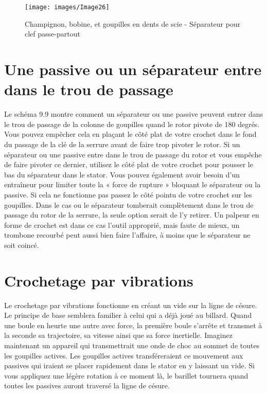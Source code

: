 \documentclass[a4paper,french,11pt,twoside]{report}
\begin{document}

\begin{figure}[ht] \begin{center}
        \texttt{[image: images/Image26]}
        \caption{Champignon, bobine, et goupilles en dents de scie - Séparateur pour clef passe-partout}
\end{center} \end{figure}


\section{\label{passive_separateur_trou_passage}Une passive ou un séparateur entre dans le trou de passage}

Le schéma 9.9 montre comment un séparateur ou une passive peuvent entrer dans le trou de passage de la colonne de goupilles quand le rotor pivote de 180 degrés. Vous pouvez empêcher cela en plaçant le côté plat de votre crochet dans le fond du passage de la clé de la serrure avant de faire trop pivoter le rotor. Si un séparateur ou une passive entre dans le trou de passage du rotor et vous empêche de faire pivoter ce dernier, utilisez le côté plat de votre crochet pour pousser le bas du séparateur dans le stator. Vous pouvez également avoir besoin d'un entraîneur pour limiter toute la « force de rupture » bloquant le séparateur ou la passive. Si cela ne fonctionne pas passez le côté pointu de votre crochet sur les goupilles. Dans le cas ou le séparateur tomberait complètement dans le trou de passage du rotor de la serrure, la seule option serait de l'y retirer. Un palpeur en forme de crochet est dans ce cas l'outil approprié, mais faute de mieux, un trombone recourbé peut aussi bien faire l'affaire, à moins que le séparateur ne soit coincé.

\section{Crochetage par vibrations}
Le crochetage par vibrations fonctionne en créant un vide sur la ligne de césure. Le principe de base semblera familier à celui qui a déjà joué au billard. Quand une boule en heurte une autre avec force, la première boule s'arrête et transmet à la seconde sa trajectoire, sa vitesse ainsi que sa force inertielle. Imaginez maintenant un appareil qui transmettrait une onde de choc au sommet de toutes les goupilles actives. Les goupilles actives transféreraient ce mouvement aux passives qui iraient se placer rapidement dans le stator en y laissant un vide. Si vous appliquez une légère rotation à ce moment là, le barillet tournera quand toutes les passives auront traversé la ligne de césure.
\end{document}
